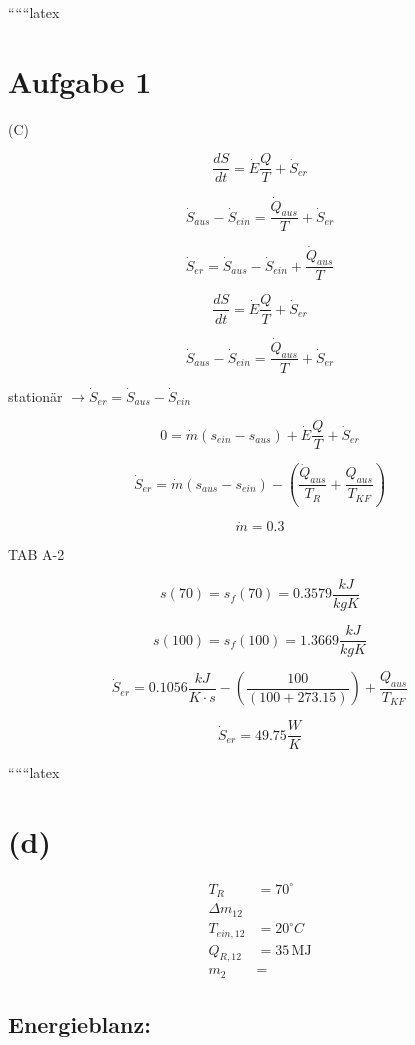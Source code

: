 ``````latex


\section*{Aufgabe 1}
(C)

\[
\frac{dS}{dt} = \dot{E} \frac{Q}{T} + \dot{S}_{er}
\]

\[
\dot{S}_{aus} - \dot{S}_{ein} = \frac{\dot{Q}_{aus}}{T} + \dot{S}_{er}
\]

\[
\dot{S}_{er} = \dot{S}_{aus} - \dot{S}_{ein} + \frac{\dot{Q}_{aus}}{T}
\]

\[
\frac{dS}{dt} = \dot{E} \frac{Q}{T} + \dot{S}_{er}
\]

\[
\dot{S}_{aus} - \dot{S}_{ein} = \frac{\dot{Q}_{aus}}{T} + \dot{S}_{er}
\]

stationär $\rightarrow \dot{S}_{er} = \dot{S}_{aus} - \dot{S}_{ein}$

\[
0 = \dot{m} \left( s_{ein} - s_{aus} \right) + \dot{E} \frac{Q}{T} + \dot{S}_{er}
\]

\[
\dot{S}_{er} = \dot{m} \left( s_{aus} - s_{ein} \right) - \left( \frac{\dot{Q}_{aus}}{T_R} + \frac{Q_{aus}}{T_{KF}} \right)
\]

\[
\dot{m} = 0.3
\]

TAB A-2

\[
s(70) = s_f(70) = 0.3579 \frac{kJ}{kgK}
\]

\[
s(100) = s_f(100) = 1.3669 \frac{kJ}{kgK}
\]

\[
\dot{S}_{er} = 0.1056 \frac{kJ}{K \cdot s} - \left( \frac{100}{(100+273.15)} \right) + \frac{Q_{aus}}{T_{KF}}
\]

\[
\dot{S}_{er} = 49.75 \frac{W}{K}
\]

``````latex


\section*{(d)}

\begin{align*}
T_R &= 70^\circ \\
\Delta m_{12} \\
T_{ein,12} &= 20^\circ C \\
Q_{R,12} &= 35 \, \text{MJ} \\
m_2 &= 
\end{align*}

\subsection*{Energieblanz:}

